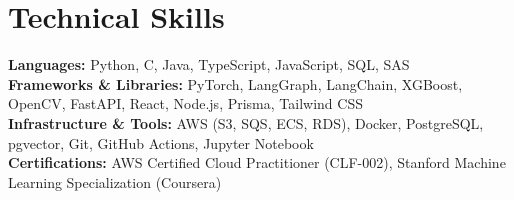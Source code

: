 \documentclass[letterpaper,10.5pt]{article}
\begin{document}
\section{Technical Skills}
 \begin{itemize}[leftmargin=0.15in, label={}]
    \small{\item{
     \textbf{Languages:} Python, C, Java, TypeScript, JavaScript, SQL, SAS \\
     \textbf{Frameworks \& Libraries:} PyTorch, LangGraph, LangChain,  XGBoost, OpenCV, FastAPI, React, Node.js, Prisma, Tailwind CSS \\
     \textbf{Infrastructure \& Tools:} AWS (S3, SQS, ECS, RDS), Docker, PostgreSQL, pgvector, Git, GitHub Actions, Jupyter Notebook \\
     \textbf{Certifications:} AWS Certified Cloud Practitioner (CLF-002), Stanford Machine Learning Specialization (Coursera)
    }}
 \end{itemize}

\end{document}

